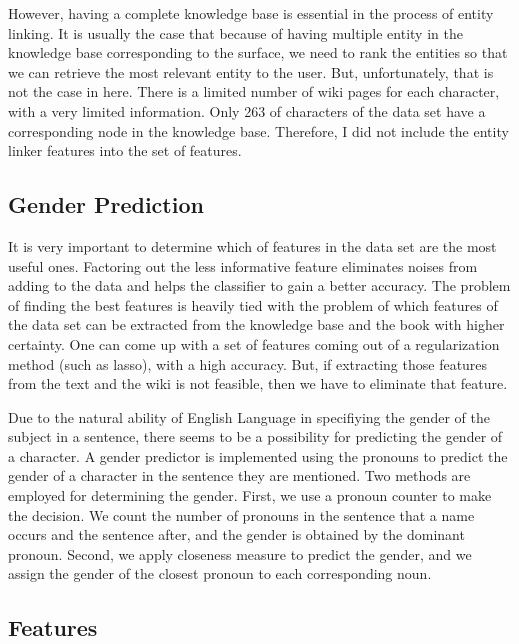 \documentclass[letterpaper]{article}
\begin{document}
However, having a complete knowledge base is essential in the process of entity linking. It is usually the case that because of having multiple entity in the knowledge base corresponding to the surface, we need to rank the entities so that we can retrieve the most relevant entity to the user. But, unfortunately, that is not the case in here. There is a limited number of wiki pages for each character, with a very limited information. Only 263 of characters of the data set have a corresponding node in the knowledge base. Therefore, I did not include the entity linker features into the set of features.

\subsection{Gender Prediction}

It is very important to determine which of features in the data set are the most useful ones. Factoring out the less informative feature eliminates noises from adding to the data and helps the classifier to gain a better accuracy. The problem of finding the best features is heavily tied with the problem of which features of the data set can be extracted from the knowledge base and the book with higher certainty. One can come up with a set of features coming out of a regularization method (such as lasso), with a high accuracy. But, if extracting those features from the text and the wiki is not feasible, then we have to eliminate that feature.


Due to the natural ability of English Language in specifiying the gender of the subject in a sentence, there seems to be a possibility for predicting the gender of a character. A gender predictor  is implemented using the pronouns to predict the gender of a character in the sentence they are mentioned. Two methods are employed for determining the gender. First, we use a pronoun counter to make the decision. We count the number of pronouns in the sentence that a name occurs and the sentence after, and the gender is obtained by the dominant pronoun. Second, we apply closeness measure to predict the gender, and we assign the gender of the closest pronoun to each corresponding noun. 


\subsection{Features}
\end{document}
